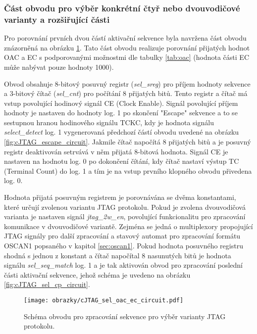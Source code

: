 \subsubsection{Část obvodu pro výběr konkrétní čtyř nebo dvouvodičové varianty a rozšiřující části}
Pro porovnání prvních dvou částí aktivační sekvence byla navržena část obvodu znázorněná na obrázku \ref{fig:cJTAG_sel_oac_ec_circuit}. Tato část obvodu realizuje porovnání přijatých hodnot \acs{OAC} a \acs{EC} s podporovanými možnostmi dle tabulky \ref{tab:oac} (hodnota části \acs{EC} může nabývat pouze hodnoty 1000).

Obvod obsahuje 8-bitový posuvný registr (\textit{sel\_sreg}) pro příjem hodnoty sekvence a 3-bitový čítač (\textit{sel\_cnt}) pro počítání 8 přijatých bitů. Tento registr a čítač má vstup povolující hodinový signál CE (Clock Enable). Signál povolující příjem hodnoty je nastaven do hodnoty log. 1 po skončení "Escape" sekvence a to se sestupnou hranou hodinového signálu TCKC, kdy je hodnota signálu \textit{select\_detect} log. 1 vygenerovaná předchozí částí obvodu uvedené na obrázku \ref{fig:cJTAG_escape_circuit}. Jakmile čítač napočítá 8 přijatých bitů a je posuvný registr deaktivován setrvává v něm přijatá 8-bitová hodnota. Signál CE je nastaven na hodnotu log. 0 po dokončení čítání, kdy čítač nastaví výstup TC (Terminal Count) do log. 1 a tím je na vstup prvního klopného obvodu přivedena log. 0.

Hodnota přijatá posuvným registrem je porovnávána se dvěma konstantami, které určují zvolenou variantu \acs{JTAG} protokolu. Pokud je zvolena dvouvodičová varianta je nastaven signál \textit{jtag\_2w\_en}, povolující funkcionalitu pro zpracování komunikace v dvouvodičové variantě. Zejména se jedná o multiplexory propojující \acs{JTAG} signály pro další zpracování a stavový automat pro  zpracování formátu OSCAN1 popsaného v kapitol \ref{sec:oscan1}. Pokud hodnota posuvného registru shodná s jednou z konstant a čítač napočítal 8 nasunutých bitů je hodnota signálu \textit{sel\_seq\_match} log. 1 a je tak aktivován obvod pro zpracování poslední části aktivační sekvence, jehož schéma je uvedeno na obrázku \ref{fig:cJTAG_sel_cp_circuit}. 


\begin{figure}[!h]
  \begin{center}
    \texttt{[image: obrazky/cJTAG\_sel\_oac\_ec\_circuit.pdf]}
  \end{center}
  \caption{Schéma obvodu pro zpracování sekvence pro výběr varianty JTAG protokolu.}
	\label{fig:cJTAG_sel_oac_ec_circuit}
\end{figure}

